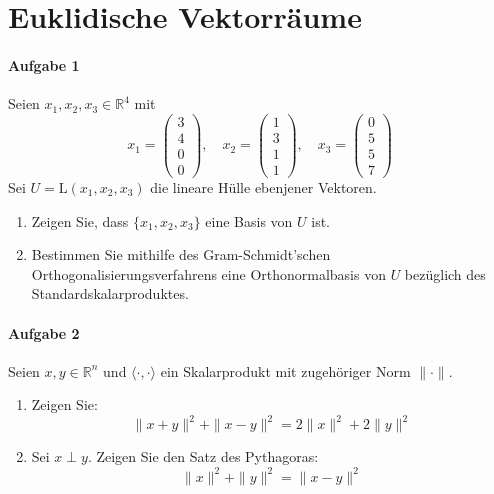 \documentclass{scrartcl}
\begin{document}
	\section{Euklidische Vektorräume}
	\paragraph{Aufgabe 1}
	Seien $x_1, x_2, x_3\in\mathbb{R}^4$ mit
	\[x_1=\begin{pmatrix}3\\4\\0\\0\end{pmatrix},\quad
	x_2=\begin{pmatrix}1\\3\\1\\1\end{pmatrix},\quad
	x_3=\begin{pmatrix}0\\5\\5\\7\end{pmatrix}\]
	Sei $U=\text{L}(x_1,x_2,x_3)$ die lineare Hülle ebenjener Vektoren.
	\begin{enumerate}[label=(\alph*)]
		\item Zeigen Sie, dass $\{x_1,x_2,x_3\}$ eine Basis von $U$ ist.
		\item Bestimmen Sie mithilfe des Gram-Schmidt'schen
			Orthogonalisierungsverfahrens eine Orthonormalbasis
			von $U$ bezüglich des Standardskalarproduktes.
	\end{enumerate}
	\paragraph{Aufgabe 2}
	Seien $x,y\in\mathbb{R}^n$ und $\langle\cdot,\cdot\rangle$
	ein Skalarprodukt mit zugehöriger Norm $\|\cdot\|$.
	\begin{enumerate}[label=(\alph*)]
		\item Zeigen Sie:
			\[\|x+y\|^2+\|x-y\|^2=2\|x\|^2+2\|y\|^2\]
		\item Sei $x\perp y$. Zeigen Sie den Satz des Pythagoras:
			\[\|x\|^2+\|y\|^2=\|x-y\|^2\]
	\end{enumerate}
\end{document}
